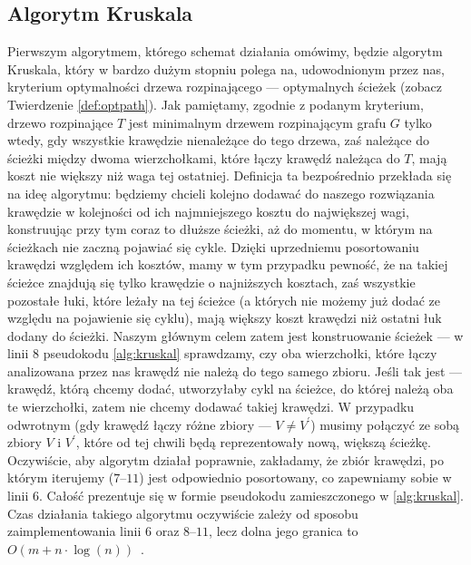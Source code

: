 \subsection{Algorytm Kruskala}

Pierwszym algorytmem, którego schemat działania omówimy, będzie algorytm Kruskala, który w bardzo dużym stopniu polega na, udowodnionym przez nas, kryterium optymalności drzewa rozpinającego --- optymalnych ścieżek (zobacz Twierdzenie \ref{def:optpath}). Jak pamiętamy, zgodnie z podanym kryterium, drzewo rozpinające $T$ jest minimalnym drzewem rozpinającym grafu $G$ tylko wtedy, gdy wszystkie krawędzie nienależące do tego drzewa, zaś należące do ścieżki między dwoma wierzchołkami, które łączy krawędź należąca do $T$, mają koszt nie większy niż waga tej ostatniej. Definicja ta bezpośrednio przekłada się na ideę algorytmu: będziemy chcieli kolejno dodawać do naszego rozwiązania krawędzie w kolejności od ich najmniejszego kosztu do największej wagi, konstruując przy tym coraz to dłuższe ścieżki, aż do momentu, w którym na ścieżkach nie zaczną pojawiać się cykle. Dzięki uprzedniemu posortowaniu krawędzi względem ich kosztów, mamy w tym przypadku pewność, że na takiej ścieżce znajdują się tylko krawędzie o najniższych kosztach, zaś wszystkie pozostałe łuki, które leżały na tej ścieżce (a których nie możemy już dodać ze względu na pojawienie się cyklu), mają większy koszt krawędzi niż ostatni łuk dodany do ścieżki. Naszym głównym celem zatem jest konstruowanie ścieżek --- w linii $8$ pseudokodu \ref{alg:kruskal} sprawdzamy, czy oba wierzchołki, które łączy analizowana przez nas krawędź nie należą do tego samego zbioru. Jeśli tak jest --- krawędź, którą chcemy dodać, utworzyłaby cykl na ścieżce, do której należą oba te wierzchołki, zatem nie chcemy dodawać takiej krawędzi. W przypadku odwrotnym (gdy krawędź łączy różne zbiory --- $V \neq V^{\prime}$) musimy połączyć ze sobą zbiory $V$ i $V^{\prime}$, które od tej chwili będą reprezentowały nową, większą ścieżkę. Oczywiście, aby algorytm działał poprawnie, zakładamy, że zbiór krawędzi, po którym iterujemy ($7$--$11$) jest odpowiednio posortowany, co zapewniamy sobie w linii $6$. Całość prezentuje się w formie pseudokodu zamieszczonego w \ref{alg:kruskal}. Czas działania takiego algorytmu oczywiście zależy od sposobu zaimplementowania linii $6$ oraz $8$--$11$, lecz dolna jego granica to $O \left( m + n \cdot \log \left( n \right) \right)$~\cite[$522$]{Ahuja:1993:NFT:137406}.

